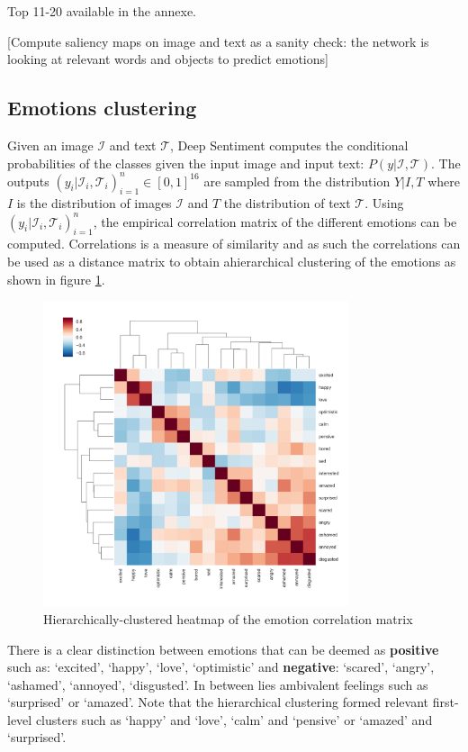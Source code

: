 \documentclass{article} %
\begin{document}
Top 11-20 available in the annexe.



[Compute saliency maps on image and text as a sanity check: the network is looking at relevant words and objects to predict emotions]

\subsection{Emotions clustering}
Given an image $\mathcal{I}$ and text $\mathcal{T}$, Deep Sentiment computes the conditional probabilities of the classes given the input image and input text: $P(y | \mathcal{I}, \mathcal{T})$. The outputs $(y_i | \mathcal{I}_i, \mathcal{T}_i)_{i=1}^n \in [0,1]^{16}$ are sampled from the distribution $Y| I, T$ where $I$ is the distribution of images $\mathcal{I}$ and $T$ the distribution of text $\mathcal{T}$. Using $(y_i | \mathcal{I}_i, \mathcal{T}_i)_{i=1}^n$, the empirical correlation matrix of the different emotions can be computed. Correlations is a measure of similarity and as such the correlations can be used as a distance matrix to obtain ahierarchical clustering of the emotions as shown in figure \ref{dendrogram}.

\begin{figure}[H]
    \centering
    \includegraphics[width=0.8\textwidth]{Images/dendrogram.jpg}
    \caption{Hierarchically-clustered heatmap of the emotion correlation matrix}
    \label{dendrogram}
\end{figure}

There is a clear distinction between emotions that can be deemed as \textbf{positive} such as: `excited', `happy', `love', `optimistic' and \textbf{negative}: `scared', `angry', `ashamed', `annoyed', `disgusted'. In between lies ambivalent feelings such as `surprised' or `amazed'. Note that the hierarchical clustering formed relevant first-level clusters such as `happy' and `love', `calm' and `pensive' or `amazed' and `surprised'.
\end{document}
